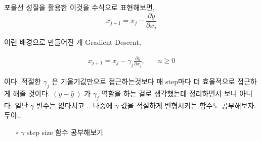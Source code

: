 \documentclass[11pt]{article}
\begin{document}
포물선 성질을 활용한 이것을 수식으로 표현해보면,
\begin{equation*}
  x_{j+1} = x_{j} -\frac{\partial y}{\partial x_{j}}
\end{equation*}

이런 배경으로 만들어진 게 Gradient Descent, 

\begin{align*}
  x_{j+1} = x_{j} -\gamma_{j}\frac{\partial y}{\partial x_{j}},\ &&n \geq 0
\end{align*}

이다. 적절한 \(\gamma_{j}\) 은 기울기값만으로 접근하는것보다 매 step마다 더 효율적으로 접근하게 해줄 것이다. \(( y - \hat{y}\ )\) 가 \(\gamma_{j}\) 역할을 하는 걸로 생각했는데 정리하면서 보니 아니다. 일단 \(\gamma\) 변수는 없다치고 .. 나중에 \(\gamma\) 값을 적절하게 변형시키는 함수도 공부해보자. 두야..
\begin{itemize}
\item[{$\square$}] \(\gamma\) step size 함수 공부해보기
\end{itemize}
\end{document}
